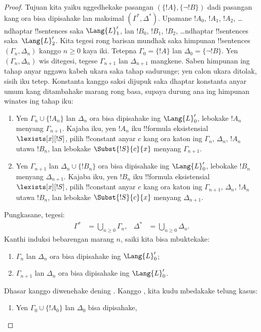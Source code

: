 \documentclass[../../../include/open-logic-section]{subfiles}
\begin{document}
\begin{proof}
Tujuan kita yaiku nggedhekake pasangan $(\{ !A \}, \{\lnot!B\})$
dadi pasangan kang ora bisa dipisahake lan maksimal
$(\Gamma^*, \Delta^*)$. Upamane $!A_0$,
$!A_1$, $!A_2$, \dots ndhaptar !!{sentence}s saka $\Lang{L}'_1$,
lan $!B_0$, $!B_1$, $!B_2$, \dots ndhaptar !!{sentence}s
saka~$\Lang{L}'_2$.
Kita tegesi rong barisan mundhak saka himpunan
!!{sentence}s $(\Gamma_n, \Delta_n)$ kanggo $n \ge 0$ kaya iki.
Tetepna $\Gamma_0 = \{ !A\}$ lan $\Delta_0 = \{\lnot !B \}$.
Yen $(\Gamma_n, \Delta_n)$ wis ditegesi, tegese
$\Gamma_{n+1}$ lan $\Delta_{n+1}$ mangkene. Saben himpunan ing tahap anyar nggawa kabeh ukara saka tahap sadurunge; yen calon ukara ditolak, sisih iku tetep. Konstanta kanggo saksi dijupuk saka dhaptar konstanta anyar umum kang ditambahake marang rong basa, supaya durung ana ing himpunan winates ing tahap iku:
\begin{enumerate}
\item Yen $\Gamma_n \cup \{!A_n \}$ lan $\Delta_n$ ora bisa dipisahake
  ing $\Lang{L}'_0$, lebokake $!A_n$ menyang $\Gamma_{n+1}$.
  Kajaba iku, yen $!A_n$ iku !!{formula} eksistensial
  $\lexists[x][!S]$, pilih !!{constant} anyar $c$ kang ora katon
  ing $\Gamma_n$, $\Delta_n$, $!A_n$ utawa $!B_n$, lan lebokake
  $\Subst{!S}{c}{x}$ menyang $\Gamma_{n+1}$.
\item Yen $\Gamma_{n+1}$ lan $\Delta_n \cup \{!B_n \}$ ora bisa
  dipisahake ing $\Lang{L}'_0$, lebokake $!B_n$ menyang
  $\Delta_{n+1}$. Kajaba iku, yen $!B_n$ iku !!{formula}
  eksistensial $\lexists[x][!S]$, pilih !!{constant} anyar $c$
  kang ora katon ing $\Gamma_{n+1}$, $\Delta_n$, $!A_n$
  utawa $!B_n$, lan lebokake $\Subst{!S}{c}{x}$ menyang
  $\Delta_{n+1}$.
\end{enumerate}
Pungkasane, tegesi:
\begin{align*}
  \Gamma^* & = \bigcup_{n\ge 0} \Gamma_n, &
  \Delta^* & = \bigcup_{n\ge 0} \Delta_n.
\end{align*}
Kanthi induksi bebarengan marang $n$, saiki kita bisa mbuktekake:
\begin{enumerate}
\item{} $\Gamma_n$ lan $\Delta_n$ ora bisa dipisahake
  ing $\Lang{L}'_0$;
\item{} $\Gamma_{n+1}$ lan $\Delta_n$ ora bisa
  dipisahake ing $\Lang{L}'_0$.
\end{enumerate}
Dhasar kanggo  diwenehake dening
. Kanggo , kita kudu
mbedakake telung kasus:
\begin{enumerate}
\item Yen $\Gamma_0 \cup \{!A_0 \}$ lan $\Delta_0$ bisa dipisahake,

\end{enumerate}
\end{proof}
\end{document}
